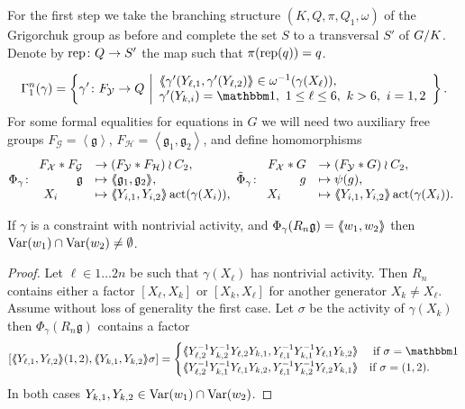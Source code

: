 \documentclass[a4paper,11pt]{amsart}
\begin{document}
For the first step we take the branching structure $(K,Q,\pi,Q_1,\omega)$
of the Grigorchuk group as before and complete the set $S$ to a
transversal $S'$ of ${G/K}$. Denote by $\operatorname{rep}\colon Q\to S'$ the
map such that $\pi(\operatorname{rep}(q)) = q$.
 
\[\Gamma_1^n(\gamma) = \left \{\gamma' 
    \colon F_{\mathcal Y} \to Q \bigmid
    \begin{array}{l}
      \pair{\gamma'(Y_{\ell,1},\gamma'(Y_{\ell,2})}\in \omega^{-1}(\gamma
      (X_\ell)), \\
      \gamma'(Y_{k,i}) = \id,\ 1\leq \ell \leq 6,\ k>6,\ i=1,2
    \end{array} \right\}.\]
For some formal equalities for equations in $G$ we will need two auxiliary free
groups $F_{\mathcal{G}}=\left<\mathfrak{g}\right>$,
$F_{\mathcal{H}}=\left<\mathfrak{g}_1,\mathfrak{g}_2\right>$, and define  homomorphisms  
\[\Phi_{\gamma}\colon
\begin{array}{rl}
 F_{\mathcal{X}}*F_{\mathcal G} &\to (F_{\mathcal{Y}}*F_{\mathcal{H}})\wr C_2,\\
  \mathfrak g   &\mapsto \langle\negthickspace\langle\mathfrak g_1, \mathfrak g_2\rangle\negthickspace\rangle,\\ 
  X_i\qquad &\mapsto \langle\negthickspace\langle Y_{i,1},Y_{i,2}\rangle\negthickspace\rangle\operatorname{act}(\gamma(X_i)),
 \end{array}
\tilde\Phi_{\gamma}\colon
\begin{array}{rl}
 F_{\mathcal{X}}*G &\to (F_{\mathcal{Y}}*G)\wr C_2,\\
   g   &\mapsto \psi(g),\\ 
  X_i\qquad &\mapsto \langle\negthickspace\langle Y_{i,1},Y_{i,2}\rangle\negthickspace\rangle\operatorname{act}(\gamma(X_i)).
 \end{array}
 \]
\begin{lem}\label{lem:commonVar}
  If $\gamma$ is a constraint with nontrivial activity, and
  $\Phi_\gamma(R_n\mathfrak g)=\langle\negthickspace\langle w_1,w_2\rangle\negthickspace\rangle$ then
  $\textup{Var}(w_1)\cap\textup{Var}(w_2)\neq \emptyset$.
\end{lem}
\begin{proof}
  Let $\ell\in 1\ldots 2n$ be such that $\gamma(X_\ell)$ has
  nontrivial activity. Then $R_n$ contains either a factor $[X_\ell,X_k]$ or
  $[X_k,X_\ell]$ for another generator $X_k\neq X_\ell$.  Assume without loss of
  generality the first case. Let $\sigma$ be the activity of $\gamma(X_k)$
  then $\Phi_\gamma(R_n \mathfrak g)$
  contains a factor
  \[ [\pair{Y_{\ell,1},Y_{\ell,2}}(1,2),\pair{Y_{k,1},Y_{k,2}}\sigma] = 
  \begin{cases}
      \pair{Y_{\ell,2}^{-1}Y_{k,2}^{-1}Y_{\ell,2}Y_{k,1},Y_{\ell,1}^{-1}Y_{k,1}^
      {-1}Y_{\ell,1}Y_{k,2}} & \textup{ if } \sigma=\id \\
      \pair{Y_{\ell,2}^{-1}Y_{k,1}^{-1}Y_{\ell,1}Y_{k,2},Y_{\ell,1}^{-1}Y_{k,2}^
      {-1}Y_{\ell,2}Y_{k,1}} & \textup{if } \sigma=(1,2) . \\
    \end{cases}
  \]
  In both cases $Y_{k,1},Y_{k,2}\in \textup{Var}(w_1)\cap \textup{Var}(w_2)$.
\end{proof}
\end{document}
